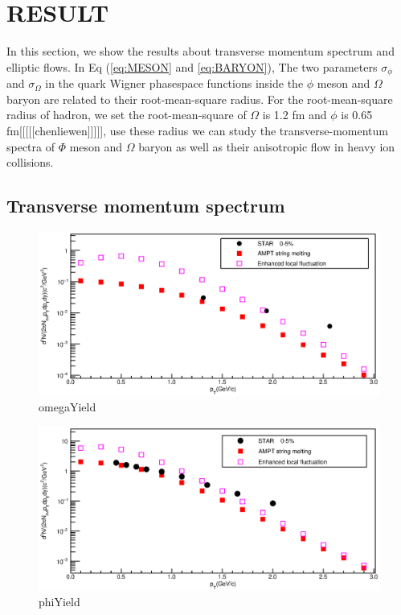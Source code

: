 \documentclass[11pt,a4paper,openany]{article}
\begin{document}
\section{RESULT}
In this section, we show the results about transverse momentum spectrum and elliptic flows. In Eq (\ref{eq:MESON} and
\ref{eq:BARYON}), The two parameters $\sigma{_{\phi}}$ and $\sigma{_{\Omega}}$ in the quark Wigner phasespace functions
inside the $\phi$ meson and $\Omega$ baryon are related to their root-mean-square radius. For the root-mean-square
radius of hadron, we set the root-mean-square of $\Omega$ is 1.2 fm and $\phi$ is 0.65 fm[[[[[chenliewen]]]]], use these
radius we can study the transverse-momentum spectra of $\Phi$ meson and $\Omega$ baryon as well as their anisotropic
flow in heavy ion collisions.
\subsection{Transverse momentum spectrum}
\begin{figure}[!ht]
  \centering
  \includegraphics[width=\textwidth]{./figure/omegaYield.eps}
  \caption{omegaYield}
  \label{fig:OmegaYield}
\end{figure}
\begin{figure}[!ht]
  \centering
  \includegraphics[width=\textwidth]{./figure/phiYield.eps}
  \caption{phiYield}
  \label{fig:PhiYield}
\end{figure}
\end{document}
